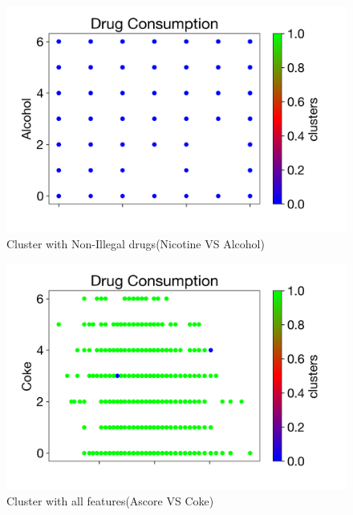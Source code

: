 \documentclass[10pt]{article}
\begin{document}
\begin{figure}[H]
\caption{Cluster with Non-Illegal drugs(Nicotine VS Alcohol) }
\label{fig:NicotineVsAlcohol}
\centering
\includegraphics[scale=0.35]{cluster2-NicotineVsAlcohol.png}
\end{figure}

\begin{figure}[H]
\caption{Cluster with all features(Ascore VS Coke) }
\label{fig:AscoreVsCoke}
\centering
\includegraphics[scale=0.35]{cluster1-AscorevsCoke.png}
\end{figure}
\end{document}
